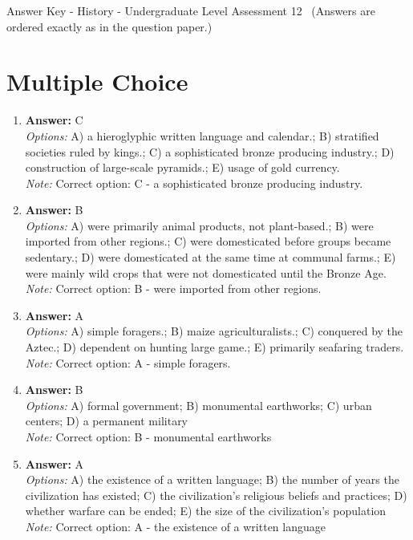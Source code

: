 \documentclass[12pt]{article}
\begin{document}
\begin{center}
Answer Key - History - Undergraduate Level Assessment 12 \
\small (Answers are ordered exactly as in the question paper.)
\end{center}

\section*{Multiple Choice}
\begin{enumerate}[label=\arabic*.]
\item \textbf{Answer:} C
\\ \textit{Options:} A) a hieroglyphic written language and calendar.; B) stratified societies ruled by kings.; C) a sophisticated bronze producing industry.; D) construction of large-scale pyramids.; E) usage of gold currency.
\\ \textit{Note:} Correct option: C - a sophisticated bronze producing industry.
\item \textbf{Answer:} B
\\ \textit{Options:} A) were primarily animal products, not plant-based.; B) were imported from other regions.; C) were domesticated before groups became sedentary.; D) were domesticated at the same time at communal farms.; E) were mainly wild crops that were not domesticated until the Bronze Age.
\\ \textit{Note:} Correct option: B - were imported from other regions.
\item \textbf{Answer:} A
\\ \textit{Options:} A) simple foragers.; B) maize agriculturalists.; C) conquered by the Aztec.; D) dependent on hunting large game.; E) primarily seafaring traders.
\\ \textit{Note:} Correct option: A - simple foragers.
\item \textbf{Answer:} B
\\ \textit{Options:} A) formal government; B) monumental earthworks; C) urban centers; D) a permanent military
\\ \textit{Note:} Correct option: B - monumental earthworks
\item \textbf{Answer:} A
\\ \textit{Options:} A) the existence of a written language; B) the number of years the civilization has existed; C) the civilization's religious beliefs and practices; D) whether warfare can be ended; E) the size of the civilization's population
\\ \textit{Note:} Correct option: A - the existence of a written language
\end{enumerate}
\end{document}
